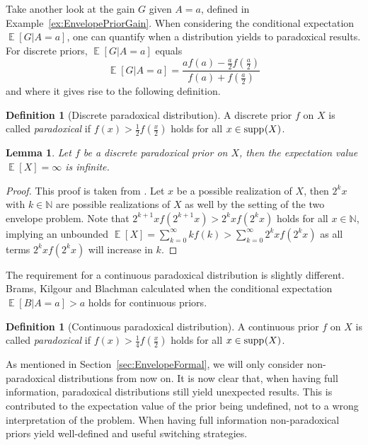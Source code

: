 \documentclass[a4paper]{report}
\theoremstyle{plain}
\newtheorem{lemma}[theorem]{Lemma}
\theoremstyle{definition}
\newtheorem{definition}[theorem]{Definition}
\theoremstyle{remark}
\numberwithin{equation}{chapter}
\newcommand{\N}{\mathbb{N}}
\let\P\relax
\DeclareMathOperator{\P}{\mathbb{P}}
\DeclareMathOperator{\E}{\mathbb{E}}
\DeclareMathOperator{\1}{\mathbbm{1}}
\DeclareMathOperator{\supp}{supp}
\begin{document}
Take another look at the gain $G$ given $A=a$, defined in Example~\ref{ex:EnvelopePriorGain}. When considering the conditional expectation $\E[G|A=a]$, one can quantify when a distribution yields to paradoxical results. For discrete priors, $\E[G|A=a]$ equals \cite{Navara17,Tzur18}
\begin{equation}
\E[G|A=a]=\frac{af(a)-\frac{a}{2}f\left(\frac{a}{2}\right)}{f(a)+f\left(\frac{a}{2}\right)}
\end{equation}
and where it gives rise to the following definition.
\begin{definition}[Discrete paradoxical distribution]
A discrete prior $f$ on $X$ is called \emph{paradoxical} if $f(x)>\frac{1}{2}f\left(\frac{x}{2}\right)$ holds for all $x\in\supp_{\P}(X)$.
\end{definition}
\begin{lemma}
Let $f$ be a discrete paradoxical prior on $X$, then the expectation value $\E[X]=\infty$ is infinite.
\end{lemma}
\begin{proof}
This proof is taken from \cite{Tzur18}. Let $x$ be a possible realization of $X$, then $2^k x$ with $k\in\N$ are possible realizations of $X$ as well by the setting of the two envelope problem. Note that $2^{k+1}xf(2^{k+1} x)>2^k xf(2^kx)$ holds for all $x\in\N$, implying an unbounded $\E[X]=\sum_{k=0}^\infty k f(k)>\sum_{k=0}^\infty 2^k xf(2^k x)$ as all terms $2^kxf(2^kx)$ will increase in $k$.
\end{proof}

The requirement for a continuous paradoxical distribution is slightly different. Brams, Kilgour and Blachman \cite{Brams95,Christensen96} calculated when the conditional expectation $\E[B|A=a]>a$ holds for continuous priors.

\begin{definition}[Continuous paradoxical distribution]
A continuous prior $f$ on $X$ is called \emph{paradoxical} if $f(x)>\frac{1}{4}f\left(\frac{x}{2}\right)$ holds for all $x\in\supp_{\P}(X)$.
\end{definition}

As mentioned in Section~\ref{sec:EnvelopeFormal}, we will only consider non-paradoxical distributions from now on. It is now clear that, when having full information, paradoxical distributions still yield unexpected results. This is contributed to the expectation value of the prior being undefined, not to a wrong interpretation of the problem. When having full information non-paradoxical priors yield well-defined and useful switching strategies.
\end{document}

